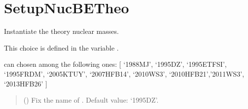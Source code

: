 \documentclass[letterpaper,10pt,english]{sphinxmanual}
\begin{document}
\section{SetupNucBETheo}
\label{\detokenize{source/api/setup_nuc_be_theo:setupnucbetheo}}\label{\detokenize{source/api/setup_nuc_be_theo::doc}}\label{\detokenize{source/api/setup_nuc_be_theo:module-nucleardatapy.setup_nuc_be_theo}}

\begin{fulllineitems}
\label{\detokenize{source/api/setup_nuc_be_theo:nucleardatapy.setup_nuc_be_theo.SetupNucBETheo}}
\pysigstartsignatures
\pysiglinewithargsret
{}
{}
{}
\pysigstopsignatures
\sphinxAtStartPar
Instantiate the theory nuclear masses.

\sphinxAtStartPar
This choice is defined in the variable .

\sphinxAtStartPar
{} can chosen among the following ones:     {[} ‘1988\sphinxhyphen{}MJ’, ‘1995\sphinxhyphen{}DZ’, ‘1995\sphinxhyphen{}ETFSI’, ‘1995\sphinxhyphen{}FRDM’,     ‘2005\sphinxhyphen{}KTUY’, ‘2007\sphinxhyphen{}HFB14’, ‘2010\sphinxhyphen{}WS3’, ‘2010\sphinxhyphen{}HFB21’,’2011\sphinxhyphen{}WS3’, ‘2013\sphinxhyphen{}HFB26’ {]}
\begin{quote}\begin{description}
\sphinxAtStartPar
{} (\sphinxstyleliteralemphasis{\sphinxupquote{, }}) \textendash{} Fix the name of . Default value: ‘1995\sphinxhyphen{}DZ’.

\end{description}\end{quote}

\sphinxAtStartPar
{}


\end{fulllineitems}
\end{document}
